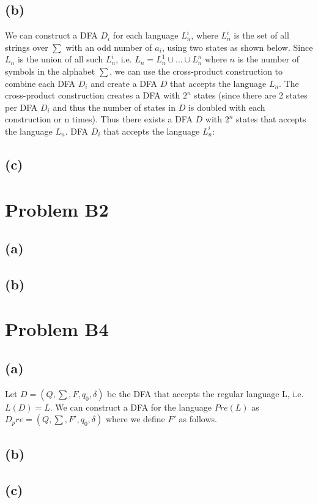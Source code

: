 \documentclass[12pt]{article}
\begin{document}
\subsection*{(b)}
  We can construct a DFA $D_i$ for each language $L^i_n$, where $L^i_n$ is the
  set of all strings over $\sum$ with an odd number of $a_i$, using two states
  as shown below. Since $L_n$ is the union of all such $L^i_n$, i.e.
  $L_n = L^1_n \cup \dots \cup L^n_n$ where $n$ is the number of symbols in the
  alphabet $\sum$, we can use the cross-product construction to combine each
  DFA $D_i$ and create a DFA $D$ that accepts the language $L_n$.
  The cross-product construction creates a DFA with $2^n$ states (since there
  are 2 states per DFA $D_i$ and thus the number of states in $D$ is doubled
  with each construction or n times). Thus there exists a DFA $D$ with $2^n$
  states that accepts the language $L_n$.
  \vspace{0.5cm}
  DFA $D_i$ that accepts the language $L^i_n$:
  \newline
  \begin{center}
  \end{center}

\subsection*{(c)}
\section*{Problem B2}
\subsection*{(a)}
\subsection*{(b)}
\section*{Problem B4}
\subsection*{(a)}
  Let $D = (Q, \sum, F, q_0, \delta)$ be the DFA that accepts the regular
  language L, i.e. $L(D) = L$. We can construct a DFA for the language
  $Pre(L)$ as $D_pre = (Q, \sum, F', q_0, \delta)$ where we define $F'$
  as follows.
\subsection*{(b)}
\subsection*{(c)}
\end{document}
